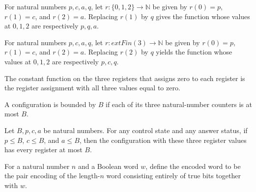 \begin{lemma}
\label{BoolCircuit.AdjScan.upd_one}
\leanok
{}
For natural numbers $p,c,a,q$, let $r:\{0,1,2\}\to\mathbb{N}$ be given by $r(0)=p$,
$r(1)=c$, and $r(2)=a$. Replacing $r(1)$ by $q$ gives the function whose values at
$0,1,2$ are respectively $p,q,a$.
\end{lemma}

\begin{lemma}
\label{BoolCircuit.AdjScan.upd_two}
\leanok
{}
For natural numbers $p,c,a,q$, let $r:	ext{Fin}(3)\to\mathbb{N}$ be given by $r(0)=p$,
$r(1)=c$, and $r(2)=a$. Replacing $r(2)$ by $q$ yields the function whose values at
$0,1,2$ are respectively $p,c,q$.
\end{lemma}

\begin{lemma}
\label{BoolCircuit.AdjScan.rg_init}
\leanok
{}
The constant function on the three registers that assigns zero to each register is the
register assignment with all three values equal to zero.
\end{lemma}

\begin{definition}
\label{BoolCircuit.AdjScan.Gd}
\leanok
{}
A configuration is bounded by $B$ if each of its three natural-number counters is at
most $B$.
\end{definition}

\begin{lemma}
\label{BoolCircuit.AdjScan.gd_rg}
\leanok
{}
Let $B,p,c,a$ be natural numbers. For any control state and any answer status, if $p\le
B$, $c\le B$, and $a\le B$, then the configuration with these three register values has
every register at most $B$.
\end{lemma}

\begin{definition}
\label{BoolCircuit.AdjScan.X}
\leanok
{}
For a natural number $n$ and a Boolean word $w$, define the encoded word to be the pair
encoding of the length-$n$ word consisting entirely of true bits together with $w$.
\end{definition}

